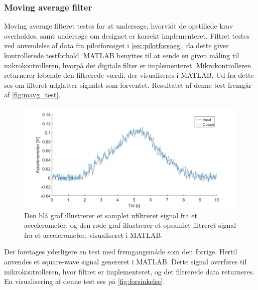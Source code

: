 \subsubsection{Moving average filter} \label{sec:mavg_test}
Moving average filteret testes for at undersøge, hvorvidt de opstillede krav overholdes, samt undersøge om designet er korrekt implementeret. 
Filtret testes ved anvendelse af data fra pilotforsøget i \autoref{sec:pilotforsoeg}, da dette giver kontrollerede testforhold. 
MATLAB benyttes til at sende en given måling til mikrokontrolleren, hvorpå det digitale filter er implementeret. 
Mikrokontrolleren returnerer løbende den filtrerede værdi, der visualiseres i MATLAB. 
Ud fra dette ses om filteret udglatter signalet som forventet. 
Resultatet af denne test fremgår af \autoref{fig:mavg_test}. 

\begin{figure}[H]
	\centering
	\includegraphics[width=1\textwidth]{figures/accelerometer_filter}
	\caption{Den blå graf illustrerer et samplet ufiltreret signal fra et accelerometer, og den røde graf illustrerer et opsamlet filtreret signal fra et accelerometer, visualiseret i MATLAB.}
	\label{fig:mavg_test}
\end{figure}

\noindent
Der foretages yderligere en test med fremgangsmåde som den forrige. 
Hertil anvendes et square-wave signal genereret i MATLAB. 
Dette signal overføres til mikrokontrolleren, hvor filtret er implementeret, og det filtrerede data returneres. 
En visualisering af denne test ses på \autoref{fig:forsinkelse}.

